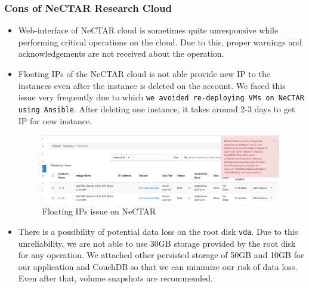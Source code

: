 \subsubsection{Cons of NeCTAR Research Cloud}
\begin{itemize}
    \item Web-interface of NeCTAR cloud is sometimes quite unresponsive while performing critical operations on the cloud. Due to this, proper warnings and acknowledgements are not received about the operation.
    \item Floating IPs of the NeCTAR cloud is not able provide new IP to the instances even after the instance is deleted on the account. We faced this issue very frequently due to which \texttt{we avoided re-deploying VMs on NeCTAR using Ansible}. After deleting one instance, it takes around 2-3 days to get IP for new instance.
    
    \begin{figure}[H]
    \centering
    \includegraphics[width=13cm,keepaspectratio=true]{images/cloud_issue.png}
    \caption{Floating IPs issue on NeCTAR}
    \label{fig:floatingipissue}
    \end{figure}
    
    \item There is a possibility of potential data loss on the root disk \texttt{vda}. Due to this unreliability, we are not able to use 30GB storage provided by the root disk for any operation. We attached other persisted storage of 50GB and 10GB for our application and CouchDB so that we can minimize our risk of data loss. Even after that, volume snapshots are recommended. 


\end{itemize}